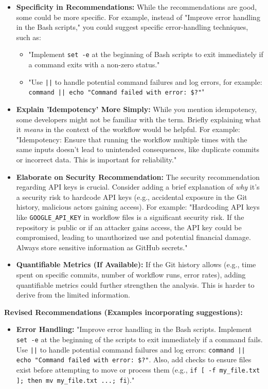 \documentclass{article}
\begin{document}
\begin{itemize}
\begin{itemize}
\begin{itemize}
\begin{itemize}
    \item \textbf{Specificity in Recommendations:} While the recommendations are good, some could be more specific. For example, instead of "Improve error handling in the Bash scripts," you could suggest specific error-handling techniques, such as:
    \begin{itemize}
        \item "Implement \texttt{set -e} at the beginning of Bash scripts to exit immediately if a command exits with a non-zero status."
        \item "Use \texttt{||} to handle potential command failures and log errors, for example: \texttt{command || echo "Command failed with error: \$?"}"
    \end{itemize}
    \item \textbf{Explain 'Idempotency' More Simply:} While you mention idempotency, some developers might not be familiar with the term. Briefly explaining what it \textit{means} in the context of the workflow would be helpful. For example:  "Idempotency: Ensure that running the workflow multiple times with the same inputs doesn't lead to unintended consequences, like duplicate commits or incorrect data.  This is important for reliability."
    \item \textbf{Elaborate on Security Recommendation:}  The security recommendation regarding API keys is crucial.  Consider adding a brief explanation of \textit{why} it's a security risk to hardcode API keys (e.g., accidental exposure in the Git history, malicious actors gaining access). For example: "Hardcoding API keys like \texttt{GOOGLE\_API\_KEY} in workflow files is a significant security risk. If the repository is public or if an attacker gains access, the API key could be compromised, leading to unauthorized use and potential financial damage.  Always store sensitive information as GitHub secrets."
    \item \textbf{Quantifiable Metrics (If Available):} If the Git history allows (e.g., time spent on specific commits, number of workflow runs, error rates), adding quantifiable metrics could further strengthen the analysis.  This is harder to derive from the limited information.
\end{itemize}

\textbf{Revised Recommendations (Examples incorporating suggestions):}

\begin{itemize}
     \item \textbf{Error Handling:} "Improve error handling in the Bash scripts. Implement \texttt{set -e} at the beginning of the scripts to exit immediately if a command fails. Use \texttt{||} to handle potential command failures and log errors: \texttt{command || echo "Command failed with error: \$?"}.  Also, add checks to ensure files exist before attempting to move or process them (e.g., \texttt{if [ -f my\_file.txt ]; then mv my\_file.txt ...; fi})."


\end{itemize}
\end{itemize}
\end{itemize}
\end{itemize}
\end{document}
